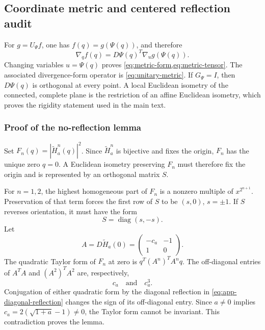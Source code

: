 \subsection{Coordinate metric and centered reflection audit}
\label{app:metric-symmetry}

For \(g=U_\Psi f\), one has \(f(q)=g(\Psi(q))\), and therefore
\begin{equation}
 \nabla_q f(q)=D\Psi(q)^T\nabla_u g(\Psi(q)).
\end{equation}
Changing variables \(u=\Psi(q)\) proves
\cref{eq:metric-form,eq:metric-tensor}.  The associated divergence-form
operator is \cref{eq:unitary-metric}.  If \(G_\Psi=I\), then \(D\Psi(q)\)
is orthogonal at every point.  A local Euclidean isometry of the connected,
complete plane is the restriction of an affine Euclidean isometry, which
proves the rigidity statement used in the main text.

\subsubsection{Proof of the no-reflection lemma}
\label{app:reflection-proof}

Set \(F_n(q)=|\widetilde H_a^n(q)|^2\).  Since
\(\widetilde H_a^n\) is bijective and fixes the origin, \(F_n\) has the
unique zero \(q=0\).  A Euclidean isometry preserving \(F_n\) must therefore
fix the origin and is represented by an orthogonal matrix \(S\).

For \(n=1,2\), the highest homogeneous part of \(F_n\) is a nonzero multiple
of \(x^{2^{n+1}}\).  Preservation of that term forces the first row of \(S\)
to be \((s,0)\), \(s=\pm1\).  If \(S\) reverses orientation, it must have
the form
\begin{equation}
 S=\operatorname{diag}(s,-s).
 \label{eq:app-diagonal-reflection}
\end{equation}
Let
\begin{equation}
 A=D\widetilde H_a(0)=
 \begin{pmatrix}-c_a&-1\\1&0\end{pmatrix}.
\end{equation}
The quadratic Taylor form of \(F_n\) at zero is
\(q^T(A^n)^TA^nq\).  The off-diagonal entries of \(A^TA\) and
\((A^2)^TA^2\) are, respectively,
\begin{equation}
 c_a\quad\text{and}\quad c_a^3.
\end{equation}
Conjugation of either quadratic form by the diagonal reflection in
\cref{eq:app-diagonal-reflection} changes the sign of its off-diagonal
entry.  Since \(a\neq0\) implies
\(c_a=2(\sqrt{1+a}-1)\neq0\), the Taylor form cannot be invariant.  This
contradiction proves the lemma.

